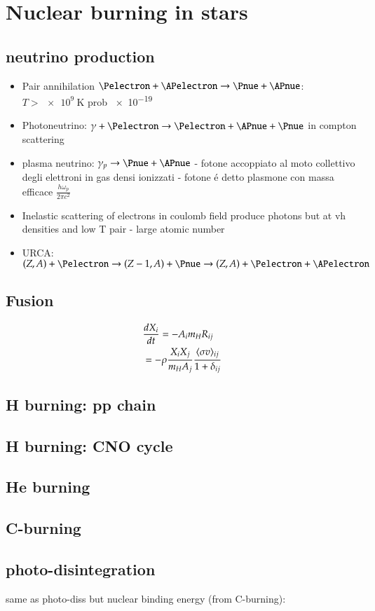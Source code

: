 \documentclass[main.tex]{subfiles}
\begin{document}
\chapter{Nuclear burning in stars}
\PartialToc

\section{neutrino production}
\begin{itemize}
\item  Pair annihilation $\Pelectron+\APelectron\to\Pnue+\APnue$: $T>\SI{e9}{\kelvin}$ prob \num{e-19}
\item Photoneutrino: $\gamma+\Pelectron\to\Pelectron+\APnue+\Pnue$ in compton scattering
\item plasma neutrino: $\gamma_p\to\Pnue+\APnue$ - fotone accoppiato al moto collettivo degli elettroni in gas densi ionizzati - fotone \'e detto plasmone con massa efficace $\frac{h\omega_p}{2\pi c^2}$
\item Inelastic scattering of electrons in coulomb field produce photons but at vh densities and low T \Pnue\APnue pair - large atomic number
\item URCA: $(Z,A)+\Pelectron\to(Z-1,A)+\Pnue\to(Z,A)+\Pelectron+\APelectron$
\end{itemize}
\section{Fusion}
\begin{align*}
&\TDy{t}{X_i}=-A_im_HR_{ij}\\
&=-\rho\frac{X_iX_j}{m_HA_j}\frac{\exv{\sigma v}_{ij}}{1+\delta_{ij}}
\end{align*} 

\section{H burning: pp chain}

\section{H burning: CNO cycle}

\section{He burning}

\section{C-burning}

\section{photo-disintegration}
same as photo-diss but nuclear binding energy (from C-burning): 
\end{document}
